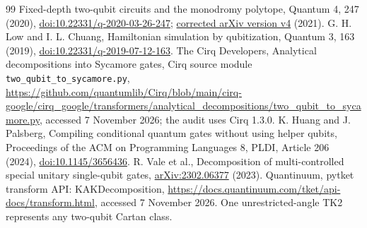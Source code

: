 \begin{thebibliography}{99}
Fixed-depth two-qubit circuits and the monodromy polytope, Quantum 4, 247
(2020), \href{https://doi.org/10.22331/q-2020-03-26-247}{doi:10.22331/q-2020-03-26-247};
\href{https://arxiv.org/abs/1904.10541v4}{corrected arXiv version v4} (2021).
 G. H. Low and I. L. Chuang, Hamiltonian simulation by
qubitization, Quantum 3, 163 (2019),
\href{https://doi.org/10.22331/q-2019-07-12-163}{doi:10.22331/q-2019-07-12-163}.
 The Cirq Developers, Analytical decompositions into
Sycamore gates, Cirq source module \texttt{two\_qubit\_to\_sycamore.py},
\url{https://github.com/quantumlib/Cirq/blob/main/cirq-google/cirq_google/transformers/analytical_decompositions/two_qubit_to_sycamore.py},
accessed 7 November 2026; the audit uses Cirq 1.3.0.
 K. Huang and J. Palsberg, Compiling conditional quantum gates
without using helper qubits, Proceedings of the ACM on Programming Languages
8, PLDI, Article 206 (2024),
\href{https://doi.org/10.1145/3656436}{doi:10.1145/3656436}.
 R. Vale et al., Decomposition of multi-controlled special
unitary single-qubit gates,
\href{https://arxiv.org/abs/2302.06377}{arXiv:2302.06377} (2023).
 Quantinuum, pytket transform API: KAKDecomposition,
\url{https://docs.quantinuum.com/tket/api-docs/transform.html}, accessed
7 November 2026. One unrestricted-angle TK2 represents any two-qubit Cartan class.
\end{thebibliography}
